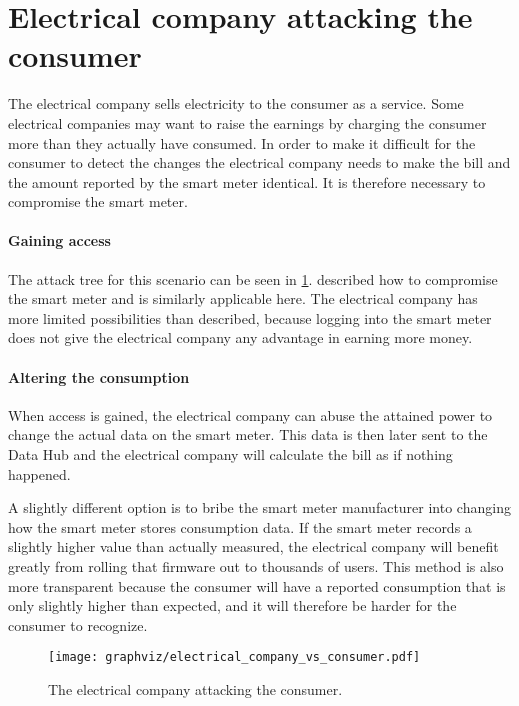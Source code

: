 \section{Electrical company attacking the consumer}
The electrical company sells electricity to the consumer as a service.
Some electrical companies may want to raise the earnings by charging the consumer more than they actually have consumed.
In order to make it difficult for the consumer to detect the changes the electrical company needs to make the bill and the amount reported by the smart meter identical.
It is therefore necessary to compromise the smart meter.

\paragraph{Gaining access}
The attack tree for this scenario can be seen in \cref{electrical_vs_consumer}.
 described how to compromise the smart meter and is similarly applicable here.
The electrical company has more limited possibilities than described, because logging into the smart meter does not give the electrical company any advantage in earning more money.

\paragraph{Altering the consumption}
When access is gained, the electrical company can abuse the attained power to change the actual data on the smart meter.
This data is then later sent to the Data Hub and the electrical company will calculate the bill as if nothing happened.

A slightly different option is to bribe the smart meter manufacturer into changing how the smart meter stores consumption data.
If the smart meter records a slightly higher value than actually measured, the electrical company will benefit greatly from rolling that firmware out to thousands of users.
This method is also more transparent because the consumer will have a reported consumption that is only slightly higher than expected, and it will therefore be harder for the consumer to recognize.

\begin{figure}
  \begin{center}
    \texttt{[image: graphviz/electrical\_company\_vs\_consumer.pdf]}
  \end{center}
  \caption{The electrical company attacking the consumer.}
  \label{electrical_vs_consumer}
\end{figure}
